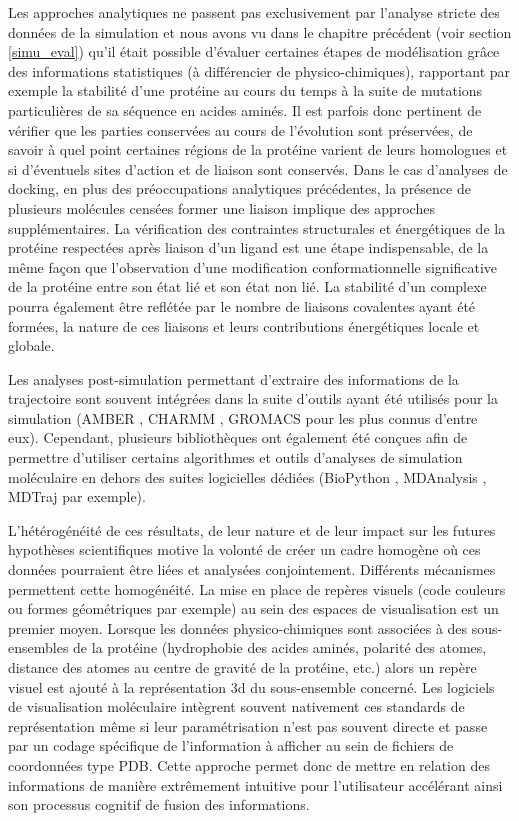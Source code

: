 Les approches analytiques ne passent pas exclusivement par l'analyse stricte des données de la simulation et nous avons vu dans le chapitre précédent (voir section \ref{simu_eval}) qu'il était possible d'évaluer certaines étapes de modélisation grâce des informations statistiques (à différencier de physico-chimiques), rapportant par exemple la stabilité d'une protéine au cours du temps à la suite de mutations particulières de sa séquence en acides aminés. Il est parfois donc pertinent de vérifier que les parties conservées au cours de l'évolution sont préservées, de savoir à quel point certaines régions de la protéine varient de leurs homologues et si d'éventuels sites d'action et de liaison sont conservés.
Dans le cas d'analyses de docking, en plus des préoccupations analytiques précédentes, la présence de plusieurs molécules censées former une liaison implique des approches supplémentaires. La vérification des contraintes structurales et énergétiques de la protéine respectées après liaison d'un ligand est une étape indispensable, de la même façon que l'observation d'une modification conformationnelle significative de la protéine entre son état lié et son état non lié. La stabilité d'un complexe pourra également être reflétée par le nombre de liaisons covalentes ayant été formées, la nature de ces liaisons et leurs contributions énergétiques locale et globale.

Les analyses post-simulation permettant d'extraire des informations de la trajectoire sont souvent intégrées dans la suite d'outils ayant été utilisés pour la simulation (AMBER \cite{pearlman1995amber}, CHARMM \cite{brooks2009charmm}, GROMACS \cite{pronk2013gromacs} pour les plus connus d'entre eux). Cependant, plusieurs bibliothèques ont également été conçues afin de permettre d'utiliser certains algorithmes et outils d'analyses de simulation moléculaire en dehors des suites logicielles dédiées (BioPython \cite{cock_biopython:_2009}, MDAnalysis \cite{michaud-agrawal_mdanalysis:_2011}, MDTraj \cite{McGibbon2014MDTraj} par exemple).

L'hétérogénéité de ces résultats, de leur nature et de leur impact sur les futures hypothèses scientifiques motive la volonté de créer un cadre homogène où ces données pourraient être liées et analysées conjointement. 
Différents mécanismes permettent cette homogénéité. La mise en place de repères visuels (code couleurs ou formes géométriques par exemple) au sein des espaces de visualisation est un premier moyen. Lorsque les données physico-chimiques sont associées à des sous-ensembles de la protéine (hydrophobie des acides aminés, polarité des atomes, distance des atomes au centre de gravité de la protéine, etc.) alors un repère visuel est ajouté à la représentation 3d du sous-ensemble concerné. Les logiciels de visualisation moléculaire intègrent souvent nativement ces standards de représentation même si leur paramétrisation n'est pas souvent directe et passe par un codage spécifique de l'information à afficher au sein de fichiers de coordonnées type PDB. Cette approche permet donc de mettre en relation des informations de manière extrêmement intuitive pour l'utilisateur accélérant ainsi son processus cognitif de fusion des informations.


